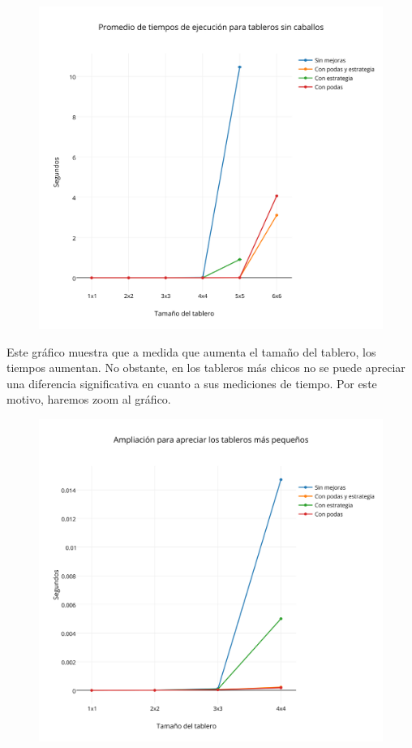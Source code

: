  \begin{figure}[h!]
   \begin{center}
   \includegraphics[scale=0.3]{../src/ej3/Mediciones/vacios/promedios1.png}
   \end{center}
 \end{figure}

Este gr\'afico muestra que a medida que aumenta el tama\~no del tablero, los tiempos aumentan. No obstante, en los tableros más chicos no se puede apreciar una diferencia significativa en cuanto a sus mediciones de tiempo. Por este motivo, haremos zoom al gr\'afico.
\newpage
 \begin{figure}[h!]
   \begin{center}
   \includegraphics[scale=0.18]{../src/ej3/Mediciones/vacios/promedios2.png}
   \end{center}
 \end{figure}


